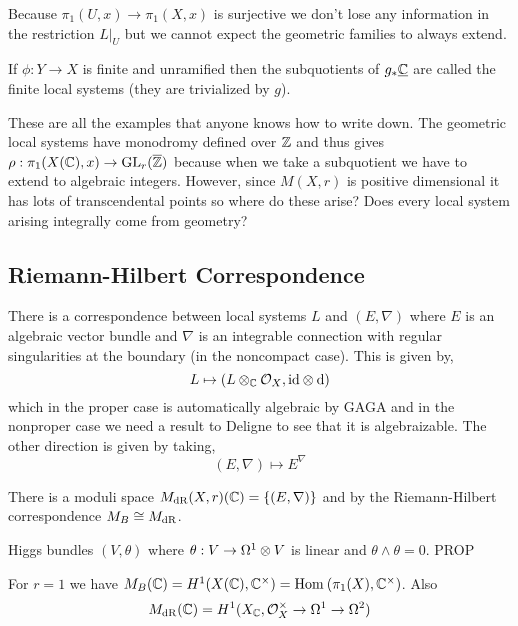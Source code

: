 \documentclass[12pt]{article}
\begin{document}
\begin{rmk}
Because $\pi_1(U, x) \to \pi_1(X, x)$ is surjective we don't lose any information in the restriction $L|_U$ but we cannot expect the geometric families to always extend. 
\end{rmk}

\begin{rmk}
If $\phi  : Y \to X$ is finite and unramified then the subquotients of $g_* \underline{\mathbb{C}}$ are called the finite local systems (they are trivialized by $g$). 
\end{rmk}

\begin{rmk}
These are all the examples that anyone knows how to write down. The geometric local systems have monodromy defined over $\mathbb{Z}$ and thus gives $\rho : \pi_1(X(\mathbb{C}), x) \to \mathrm{GL}_r(\overline{\mathbb{Z}})$ because when we take a subquotient we have to extend to algebraic integers. However, since $M(X, r)$ is positive dimensional it has lots of transcendental points so where do these arise? Does every local system arising integrally come from geometry? 
\end{rmk}

\subsection{Riemann-Hilbert Correspondence}

There is a correspondence between local systems $L$ and $(E, \nabla)$ where $E$ is an algebraic vector bundle and $\nabla$ is an integrable connection with regular singularities at the boundary (in the noncompact case). This is given by,
\[ L \mapsto (L \otimes_{\mathbb{C}} \mathcal{O}_{X}, \mathrm{id} \otimes \mathrm{d}{}) \]
which in the proper case is automatically algebraic by GAGA and in the nonproper case we need a result to Deligne to see that it is algebraizable. The other direction is given by taking,
\[ (E, \nabla) \mapsto E^{\nabla} \]

\begin{prop}
There is a moduli space $M_{\mathrm{dR}}(X, r)(\mathbb{C}) = \{ (E, \nabla) \} $ and by the Riemann-Hilbert correspondence $M_B \cong M_{\mathrm{dR}}$. 
\end{prop}

\begin{theorem}[Simpson, '90s] Higgs bundles $(V, \theta)$ where $\theta : V \to \Omega^1 \otimes V$ is linear and $\theta \wedge \theta = 0$. PROP
\end{theorem}

\begin{example}
For $r = 1$ we have $M_B(\mathbb{C}) = H^1(X(\mathbb{C}), \mathbb{C}^\times) = \mathrm{Hom}_{} \left( \pi_1(X), \mathbb{C}^\times \right)$. Also
\[ M_{\mathrm{dR}}(\mathbb{C}) = H^1(X_{\mathbb{C}}, \mathcal{O}_{X}^\times \to \Omega^1 \to \Omega^2) \] 
\end{example}
\end{document}
